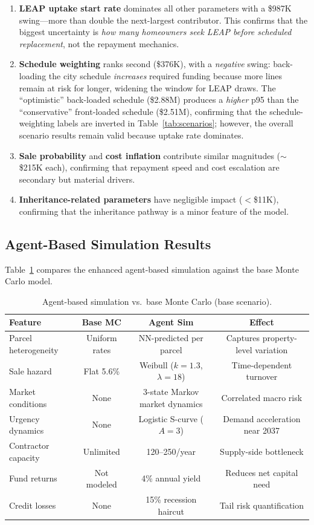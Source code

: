 \documentclass[11pt, letterpaper]{article}
\begin{document}
\begin{enumerate}[nosep]
  \item \textbf{LEAP uptake start rate} dominates all other parameters with a \$987K swing---more than double the next-largest contributor. This confirms that the biggest uncertainty is \emph{how many homeowners seek LEAP before scheduled replacement}, not the repayment mechanics.
  \item \textbf{Schedule weighting} ranks second (\$376K), with a \emph{negative} swing: back-loading the city schedule \emph{increases} required funding because more lines remain at risk for longer, widening the window for LEAP draws. The ``optimistic'' back-loaded schedule (\$2.88M) produces a \emph{higher} p95 than the ``conservative'' front-loaded schedule (\$2.51M), confirming that the schedule-weighting labels are inverted in Table~\ref{tab:scenarios}; however, the overall scenario results remain valid because uptake rate dominates.
  \item \textbf{Sale probability} and \textbf{cost inflation} contribute similar magnitudes (${\sim}$\$215K each), confirming that repayment speed and cost escalation are secondary but material drivers.
  \item \textbf{Inheritance-related parameters} have negligible impact ($<$\$11K), confirming that the inheritance pathway is a minor feature of the model.
\end{enumerate}

\subsection{Agent-Based Simulation Results}

Table~\ref{tab:agent_results} compares the enhanced agent-based simulation against the base Monte Carlo model.

\begin{table}[H]
  \centering
  \caption{Agent-based simulation vs.\ base Monte Carlo (base scenario).}
  \label{tab:agent_results}
  \begin{tabular}{@{}lccc@{}}
    \toprule
    \textbf{Feature} & \textbf{Base MC} & \textbf{Agent Sim} & \textbf{Effect} \\
    \midrule
    Parcel heterogeneity & Uniform rates & NN-predicted per parcel & Captures property-level variation \\
    Sale hazard & Flat 5.6\% & Weibull ($k{=}1.3$, $\lambda{=}18$) & Time-dependent turnover \\
    Market conditions & None & 3-state Markov market dynamics & Correlated macro risk \\
    Urgency dynamics & None & Logistic S-curve ($A{=}3$) & Demand acceleration near 2037 \\
    Contractor capacity & Unlimited & 120--250/year & Supply-side bottleneck \\
    Fund returns & Not modeled & 4\% annual yield & Reduces net capital need \\
    Credit losses & None & 15\% recession haircut & Tail risk quantification \\
    \bottomrule
  \end{tabular}
\end{table}
\end{document}
